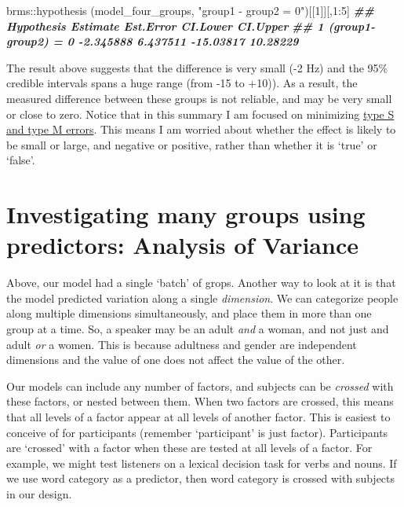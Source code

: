 \documentclass[
]{book}
\newenvironment{Shaded}{\begin{snugshade}}{\end{snugshade}}
\newcommand{\DecValTok}[1]{\textcolor[rgb]{0.00,0.00,0.81}{#1}}
\newcommand{\DocumentationTok}[1]{\textcolor[rgb]{0.56,0.35,0.01}{\textbf{\textit{#1}}}}
\newcommand{\FunctionTok}[1]{\textcolor[rgb]{0.00,0.00,0.00}{#1}}
\newcommand{\NormalTok}[1]{#1}
\newcommand{\SpecialCharTok}[1]{\textcolor[rgb]{0.00,0.00,0.00}{#1}}
\newcommand{\StringTok}[1]{\textcolor[rgb]{0.31,0.60,0.02}{#1}}
\begin{document}
\begin{Shaded}
\begin{Highlighting}[]
\NormalTok{brms}\SpecialCharTok{::}\FunctionTok{hypothesis}\NormalTok{ (model\_four\_groups, }\StringTok{"group1 {-} group2 = 0"}\NormalTok{)[[}\DecValTok{1}\NormalTok{]][,}\DecValTok{1}\SpecialCharTok{:}\DecValTok{5}\NormalTok{]}
\DocumentationTok{\#\#            Hypothesis  Estimate Est.Error  CI.Lower CI.Upper}
\DocumentationTok{\#\# 1 (group1{-}group2) = 0 {-}2.345888  6.437511 {-}15.03817 10.28229}
\end{Highlighting}
\end{Shaded}

The result above suggests that the difference is very small (-2 Hz) and the 95\% credible intervals spans a huge range (from -15 to +10)). As a result, the measured difference between these groups is not reliable, and may be very small or close to zero. Notice that in this summary I am focused on minimizing \href{https://statmodeling.stat.columbia.edu/2004/12/29/type_1_type_2_t/}{type S and type M errors}. This means I am worried about whether the effect is likely to be small or large, and negative or positive, rather than whether it is `true' or `false'.

\hypertarget{investigating-many-groups-using-predictors-analysis-of-variance}{%
\section{Investigating many groups using predictors: Analysis of Variance}\label{investigating-many-groups-using-predictors-analysis-of-variance}}

Above, our model had a single `batch' of grops. Another way to look at it is that the model predicted variation along a single \emph{dimension}. We can categorize people along multiple dimensions simultaneously, and place them in more than one group at a time. So, a speaker may be an adult \emph{and} a woman, and not just and adult \emph{or} a women. This is because adultness and gender are independent dimensions and the value of one does not affect the value of the other.

Our models can include any number of factors, and subjects can be \emph{crossed} with these factors, or nested between them. When two factors are crossed, this means that all levels of a factor appear at all levels of another factor. This is easiest to conceive of for participants (remember `participant' is just factor). Participants are `crossed' with a factor when these are tested at all levels of a factor. For example, we might test listeners on a lexical decision task for verbs and nouns. If we use word category as a predictor, then word category is crossed with subjects in our design.
\end{document}
